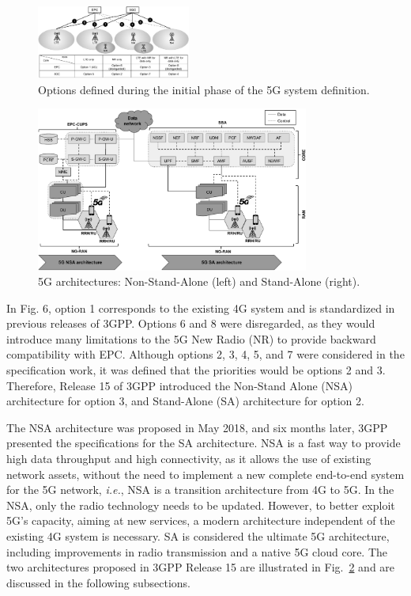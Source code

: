 \begin{figure}[htb]  
  \begin{center}
    \includegraphics[width=0.45\textwidth]{figs/opcoes_arq_eng.pdf}
  \end{center}
      \caption{Options defined during the initial phase of the 5G system definition.}
 \label{fig:opcoes_arq}
 \end{figure}
 
  \begin{figure}[htb]  
  \begin{center}
    \includegraphics[width=0.8\textwidth]{figs/Arquiteturas_5G_eng.pdf}
   \end{center}
    \caption{5G architectures: Non-Stand-Alone (left) and Stand-Alone (right).}
 \label{fig:arch5g}
 \end{figure}
In Fig. 6, option 1 corresponds to the existing 4G system and is standardized in previous releases of 3GPP. Options 6 and 8 were disregarded, as they would introduce many limitations to the 5G New Radio (NR) to provide backward compatibility with EPC. Although options 2, 3, 4, 5, and 7 were considered in the specification work, it was defined that the priorities would be options 2 and 3. Therefore, Release 15 of 3GPP introduced the Non-Stand Alone (NSA) architecture for option 3, and Stand-Alone (SA) architecture for option 2.

The NSA architecture was proposed in May 2018, and six months later, 3GPP presented the specifications for the SA architecture. NSA is a fast way to provide high data throughput and high connectivity, as it allows the use of existing network assets, without the need to implement a new complete end-to-end system for the 5G network, \textit{i.e.}, NSA is a transition architecture from 4G to 5G. In the NSA, only the radio technology needs to be updated. However, to better exploit 5G's capacity, aiming at new services, a modern architecture independent of the existing 4G system is necessary. SA is considered the ultimate 5G architecture, including improvements in radio transmission and a native 5G cloud core. The two architectures proposed in 3GPP Release 15 are illustrated in Fig.~\ref{fig:arch5g} and are discussed in the following subsections.



